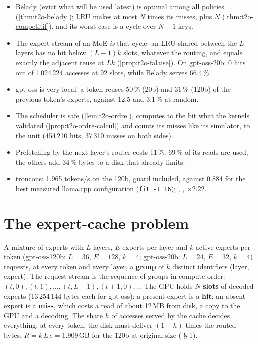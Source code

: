 \begin{enbref}
\begin{itemize}
\item Belady (evict what will be used latest) is optimal among all policies (\cref{thm:t2o-belady}); LRU makes at most $N$ times its misses, plus $N$ (\cref{thm:t2o-competitif}), and its worst case is a cycle over $N + 1$ keys.
\item The expert stream of an MoE \emph{is} that cycle: an LRU shared between the $L$ layers has no hit below $(L-1)k$ slots, whatever the routing, and equals exactly the adjacent reuse at $Lk$ (\cref{prop:t2o-falaise}). On gpt-oss-20b: 0 hits out of 1\,024\,224 accesses at 92 slots, while Belady serves 66.4\,\%.
\item gpt-oss is very local: a token reuses 50\,\% (20b) and 31\,\% (120b) of the previous token's experts, against 12.5 and 3.1\,\% at random.
\item The scheduler is safe (\cref{lem:t2o-ordre}), computes to the bit what the kernels validated (\cref{prop:t2o-ordre-calcul}) and counts its misses like its simulator, to the unit (454\,210 hits, 37\,310 misses on both sides).
\item Prefetching by the next layer's router costs 11\,\%: 69\,\% of its reads are used, the others add 34\,\% bytes to a disk that already limits.
\item troncons: 1.965 tokens/s on the 120b, guard included, against 0.884 for the best measured llama.cpp configuration (\texttt{fit -t 16}); , , $\times 2.22$.
\end{itemize}
\end{enbref}

\section{The expert-cache problem}\label{sec:t2o-probleme}

A mixture of experts with $L$ layers, $E$ experts per layer and $k$ active experts per token (gpt-oss-120b: $L = 36$, $E = 128$, $k = 4$; gpt-oss-20b: $L = 24$, $E = 32$, $k = 4$) requests, at every token and every layer, a \textbf{group} of $k$ distinct identifiers (layer, expert). The request stream is the sequence of groups in compute order: $(t, 0), (t, 1), \ldots, (t, L-1), (t+1, 0), \ldots$ The GPU holds $N$ \textbf{slots} of decoded experts (13\,254\,144 bytes each for gpt-oss); a present expert is a \textbf{hit}; an absent expert is a \textbf{miss}, which costs a read of about 12\,MB from disk, a copy to the GPU and a decoding. The share $h$ of accesses served by the cache decides everything: at every token, the disk must deliver $(1 - h)$ times the routed bytes, $R = k\,L\,e = 1.909$\,GB for the 120b at original size ( § 1).

